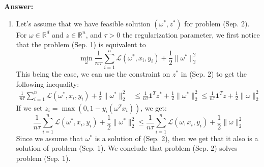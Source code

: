 \documentclass[11pt,a4paper]{article}
\newenvironment{solution}{
  \par\noindent\textbf{Answer:}\vspace{0.3em}
}{\vspace{1em}}
\begin{document}
\begin{solution}
    \begin{enumerate}
        \item Let's assume that we have feasible solution $(\omega^*, z^*)$ for problem (Sep. 2). For $\omega \in \mathbb{R}^d$ and $z \in \mathbb{R}^n$, and $\tau > 0$ the regularization parameter, we first notice that the problem (Sep. 1) is equivalent to $$\min_\omega \frac{1}{n\tau} \sum_{i=1}^n \mathcal{L}(\omega^*, x_i, y_i) + \frac{1}{2} \|\omega^*\|_2^2$$
        This being the case, we can use the constraint on $z^*$ in (Sep. 2) to get the following inequality: $$\begin{aligned}
            \frac{1}{n\tau} \sum_{i=1}^n \mathcal{L}(\omega^*, x_i, y_i) + \frac{1}{2} \|\omega^*\|_2^2
            &\leq \frac{1}{n\tau} \boldsymbol{1}^T z^* + \frac{1}{2} \|\omega^*\|_2^2 \leq \frac{1}{n\tau}\boldsymbol{1}^T z + \frac{1}{2}\|\omega\|_2^2
        \end{aligned}$$
        If we set $z_i = \max(0, 1 - y_i(\omega^T x_i))$, we get: $$\frac{1}{n\tau} \sum_{i=1}^n \mathcal{L}(\omega^*, x_i, y_i) + \frac{1}{2}\|\omega^*\|_2^2 \leq \frac{1}{n\tau} \sum_{i=1}^n \mathcal{L}(\omega, x_i, y_i) + \frac{1}{2}\|\omega\|_2^2$$
        Since we assume that $\omega^*$ is a solution of (Sep. 2), then we get that it also is a solution of problem (Sep. 1). We conclude that problem (Sep. 2) solves problem (Sep. 1).




\end{enumerate}
\end{solution}
\end{document}
